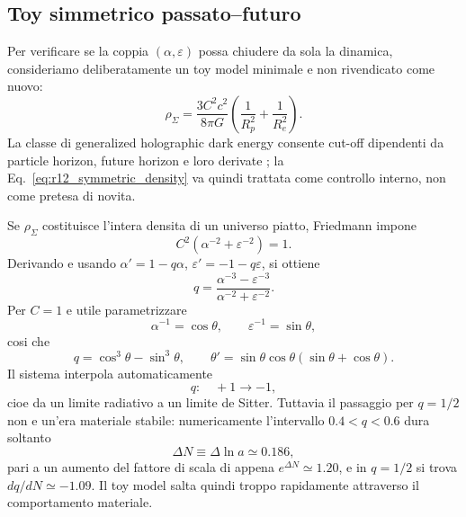 \documentclass[11pt,a4paper]{article}
\begin{document}
\subsection{Toy simmetrico passato--futuro}

Per verificare se la coppia $(\alpha,\varepsilon)$ possa chiudere da sola la dinamica, consideriamo deliberatamente un toy model minimale e non rivendicato come nuovo:
\begin{equation}
 \rho_\Sigma=\frac{3C^2c^2}{8\pi G}
 \left(\frac{1}{R_p^2}+\frac{1}{R_e^2}\right).
 \label{eq:r12_symmetric_density}
\end{equation}
La classe di generalized holographic dark energy consente cut-off dipendenti da particle horizon, future horizon e loro derivate \cite{NojiriOdintsov2017}; la Eq.~\eqref{eq:r12_symmetric_density} va quindi trattata come controllo interno, non come pretesa di novita.

Se $\rho_\Sigma$ costituisce l'intera densita di un universo piatto, Friedmann impone
\begin{equation}
 \boxed{C^2\left(\alpha^{-2}+\varepsilon^{-2}\right)=1}.
 \label{eq:r12_symmetric_constraint}
\end{equation}
Derivando e usando $\alpha'=1-q\alpha$, $\varepsilon'=-1-q\varepsilon$, si ottiene
\begin{equation}
 \boxed{
 q=\frac{\alpha^{-3}-\varepsilon^{-3}}
 {\alpha^{-2}+\varepsilon^{-2}}
 }.
 \label{eq:r12_symmetric_q}
\end{equation}
Per $C=1$ e utile parametrizzare
\begin{equation}
 \alpha^{-1}=\cos\theta,
 \qquad
 \varepsilon^{-1}=\sin\theta,
\end{equation}
cosi che
\begin{equation}
 q=\cos^3\theta-\sin^3\theta,
 \qquad
 \theta'=\sin\theta\cos\theta(\sin\theta+\cos\theta).
\end{equation}
Il sistema interpola automaticamente
\begin{equation}
 q:\quad +1\longrightarrow-1,
\end{equation}
cioe da un limite radiativo a un limite de Sitter. Tuttavia il passaggio per $q=1/2$ non e un'era materiale stabile: numericamente l'intervallo $0.4<q<0.6$ dura soltanto
\begin{equation}
 \Delta N\equiv\Delta\ln a\simeq0.186,
\end{equation}
pari a un aumento del fattore di scala di appena $e^{\Delta N}\simeq1.20$, e in $q=1/2$ si trova $dq/dN\simeq-1.09$. Il toy model salta quindi troppo rapidamente attraverso il comportamento materiale.
\end{document}
